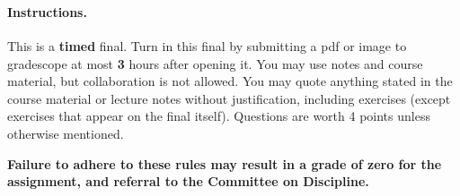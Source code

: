 \documentclass[12pt]{article}
\begin{document}

 \\
~\\

\paragraph{Instructions.} This is a {\bf timed} final. Turn in this final by submitting a pdf or image to gradescope at most \textbf{3} hours after opening it. You may use notes and course material, but collaboration is not allowed. You may quote anything stated in the course material or lecture notes without justification, including exercises (except exercises that appear on the final itself). Questions are worth 4 points unless otherwise mentioned.

\textbf{Failure to adhere to these rules may result in a grade of zero for the assignment, and referral to the Committee on Discipline.}
\end{document}
